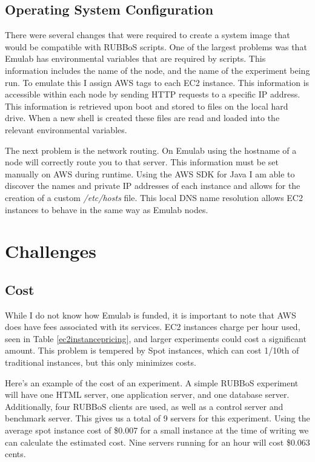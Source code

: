 \documentclass{article}
\begin{document}
\subsection{Operating System Configuration}
There were several changes that were required to create a system image that would be compatible with RUBBoS scripts. One of the largest problems was that Emulab has environmental variables that are required by scripts. This information includes the name of the node, and the name of the experiment being run. To emulate this I assign AWS tags to each EC2 instance. This information is accessible within each node by sending HTTP requests to a specific IP address\cite{metaDataRetr}.
This information is retrieved upon boot and stored to files on the local hard drive. When a new shell is created these files are read and loaded into the relevant environmental variables.

The next problem is the network routing. On Emulab using the hostname of a node will correctly route you to that server. This information must be set manually on AWS during runtime. Using the AWS SDK for Java I am able to discover the names and private IP addresses of each instance and allows for the creation of a custom {\it/etc/hosts} file. This local DNS name resolution allows EC2 instances to behave in the same way as Emulab nodes.
\section{Challenges}
\subsection{Cost}
While I do not know how Emulab is funded, it is important to note that AWS does have fees associated with its services. EC2 instances charge per hour used, seen in Table \ref{ec2instancepricing}, and larger experiments could cost a significant amount. This problem is tempered by Spot instances, which can cost 1/10th of traditional instances, but this only minimizes costs.

Here's an example of the cost of an experiment. A simple RUBBoS experiment will have one HTML server, one application server, and one database server. Additionally, four RUBBoS clients are used, as well as a control server and benchmark server. This gives us a total of 9 servers for this experiment. Using the average spot instance cost of \$0.007 for a small instance at the time of writing we can calculate the estimated cost. Nine servers running for an hour will cost \$0.063 cents.
\end{document}
